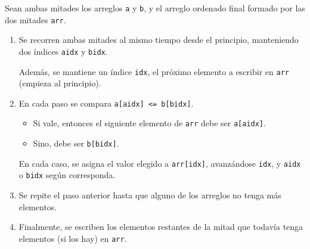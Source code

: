 \documentclass{beamer}
\begin{document}
    \begin{frame}[noframenumbering]
        Sean ambas mitades los arreglos \texttt{a} y \texttt{b}, y el arreglo ordenado final formado por las dos mitades \texttt{arr}. \pause
        \begin{enumerate}
            \item Se recorren ambas mitades al mismo tiempo desde el principio, manteniendo dos índices \texttt{aidx} y \texttt{bidx}. \pause
               
            Además, se mantiene un índice \texttt{idx}, el próximo elemento a escribir en \texttt{arr} (empieza al principio). \pause 
            \item En cada paso se compara \texttt{a[aidx] <= b[bidx]}. \pause
                \begin{itemize}
                    \item Si vale, entonces el siguiente elemento de \texttt{arr} debe ser \texttt{a[aidx]}. \pause
                    \item Sino, debe ser \texttt{b[bidx]}.  \pause 
                \end{itemize}
                En cada caso, se asigna el valor elegido a \texttt{arr[idx]}, avanzándose \texttt{idx}, y \texttt{aidx} o \texttt{bidx} según corresponda. \pause
            \item Se repite el paso anterior hasta que alguno de los arreglos no tenga más elementos. \pause

            \item Finalmente, se escriben los elementos restantes de la mitad que todavía tenga elementos (si los hay) en \texttt{arr}.
        \end{enumerate}
    \end{frame}
\end{document}
